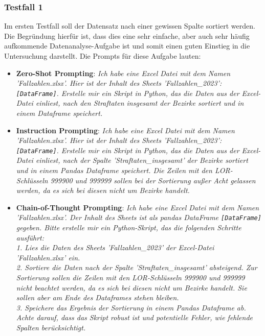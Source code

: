 \documentclass[11pt,a4paper]{article}
\begin{document}
\subsubsection{Testfall 1}
    Im ersten Testfall soll der Datensatz nach einer gewissen Spalte sortiert werden. Die Begründung hierfür ist, dass dies eine sehr einfache, aber auch sehr häufig aufkommende Datenanalyse-Aufgabe ist und somit einen guten Einstieg in die Untersuchung darstellt. Die Prompts für diese Aufgabe lauten:
    \begin{itemize}
        \item \textbf{Zero-Shot Prompting}: \emph{Ich habe eine Excel Datei mit dem Namen 'Fallzahlen.xlsx'. Hier ist der Inhalt des Sheets 'Fallzahlen\_2023': \texttt{[DataFrame]}. Erstelle mir ein Skript in Python, das die Daten aus der Excel-Datei einliest, nach den Straftaten insgesamt der Bezirke sortiert und in einem Dataframe speichert.}
        \item \textbf{Instruction Prompting}: \emph{Ich habe eine Excel Datei mit dem Namen 'Fallzahlen.xlsx'. Hier ist der Inhalt des Sheets 'Fallzahlen\_2023': \texttt{[DataFrame]}. Erstelle mir ein Skript in Python, das die Daten aus der Excel-Datei einliest, nach der Spalte 'Straftaten\_insgesamt' der Bezirke sortiert und in einem Pandas Dataframe speichert. Die Zeilen mit den LOR-Schlüsseln 999900 und 999999 sollen bei der Sortierung außer Acht gelassen werden, da es sich bei diesen nicht um Bezirke handelt.}
        \item \textbf{Chain-of-Thought Prompting}: \emph{Ich habe eine Excel Datei mit dem Namen 'Fallzahlen.xlsx'. Der Inhalt des Sheets ist als pandas DataFrame \texttt{[DataFrame]} gegeben. Bitte erstelle mir ein Python-Skript, das die folgenden Schritte ausführt:\\1. Lies die Daten des Sheets 'Fallzahlen\_2023' der Excel-Datei 'Fallzahlen.xlsx' ein.\\2. Sortiere die Daten nach der Spalte 'Straftaten\_insgesamt' absteigend. Zur Sortierung sollen die Zeilen mit den LOR-Schlüsseln 999900 und 999999 nicht beachtet werden, da es sich bei diesen nicht um Bezirke handelt. Sie sollen aber am Ende des Dataframes stehen bleiben.\\3. Speichere das Ergebnis der Sortierung in einem Pandas Dataframe ab.\\Achte darauf, dass das Skript robust ist und potentielle Fehler, wie fehlende Spalten berücksichtigt.}
    \end{itemize}
\end{document}
